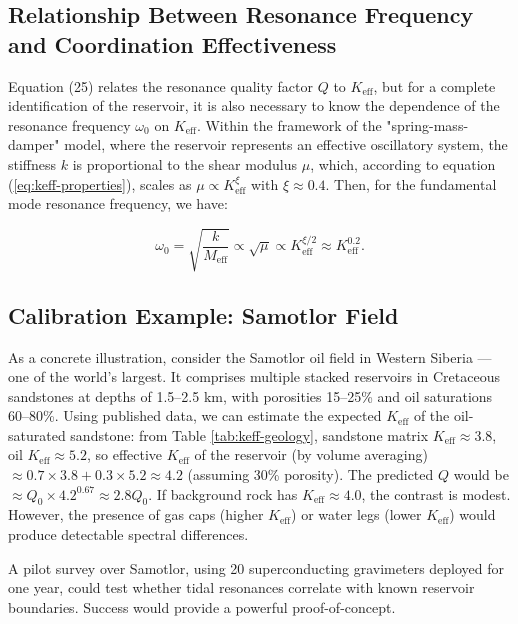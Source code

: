 \documentclass[12pt,a4paper]{article}
\theoremstyle{remark}
\newcommand{\Keff}{K_{\mathrm{eff}}}
\begin{document}
	\subsection{Relationship Between Resonance Frequency and Coordination Effectiveness}
	\label{subsec:frequency_keff}
	
	Equation (25) relates the resonance quality factor \(Q\) to \(\Keff\), but for a complete identification of the reservoir, it is also necessary to know the dependence of the resonance frequency \(\omega_0\) on \(\Keff\). Within the framework of the "spring-mass-damper" model, where the reservoir represents an effective oscillatory system, the stiffness \(k\) is proportional to the shear modulus \(\mu\), which, according to equation (\ref{eq:keff-properties}), scales as \(\mu \propto \Keff^{\xi}\) with \(\xi \approx 0.4\). Then, for the fundamental mode resonance frequency, we have:
	
	\begin{equation}
		\omega_0 = \sqrt{\frac{k}{M_{\text{eff}}}} \propto \sqrt{\mu} \propto \Keff^{\xi/2} \approx \Keff^{0.2}.
		\label{eq:omega_keff}
	\end{equation}
	
	\subsection{Calibration Example: Samotlor Field}
	
	As a concrete illustration, consider the Samotlor oil field in Western Siberia — one of the world's largest. It comprises multiple stacked reservoirs in Cretaceous sandstones at depths of 1.5–2.5 km, with porosities 15–25\% and oil saturations 60–80\%. Using published data, we can estimate the expected $\Keff$ of the oil-saturated sandstone: from Table \ref{tab:keff-geology}, sandstone matrix $\Keff \approx 3.8$, oil $\Keff \approx 5.2$, so effective $\Keff$ of the reservoir (by volume averaging) $\approx 0.7 \times 3.8 + 0.3 \times 5.2 \approx 4.2$ (assuming 30\% porosity). The predicted $Q$ would be $\approx Q_0 \times 4.2^{0.67} \approx 2.8 Q_0$. If background rock has $\Keff \approx 4.0$, the contrast is modest. However, the presence of gas caps (higher $\Keff$) or water legs (lower $\Keff$) would produce detectable spectral differences.
	
	A pilot survey over Samotlor, using 20 superconducting gravimeters deployed for one year, could test whether tidal resonances correlate with known reservoir boundaries. Success would provide a powerful proof-of-concept.
	
\end{document}
